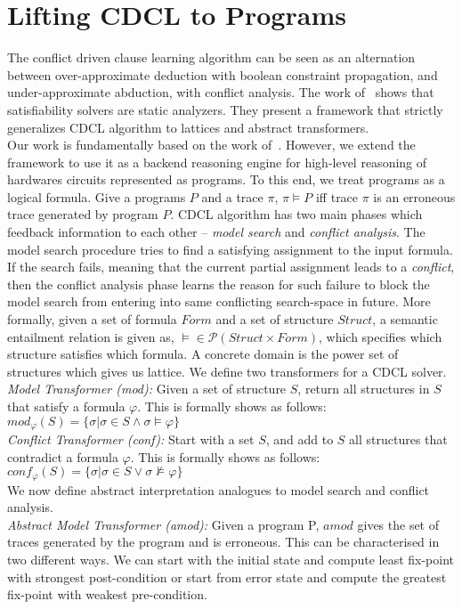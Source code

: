 \documentclass[a4paper,conference]{llncs}
\begin{document}
\section{Lifting CDCL to Programs}
The conflict driven clause learning algorithm can be seen as an 
alternation between over-approximate deduction with boolean 
constraint propagation, and under-approximate abduction, with 
conflict analysis. The work of~\cite{dhk2013-popl,sas12,tacas12} 
shows that satisfiability solvers are static analyzers. They present 
a framework that strictly generalizes CDCL algorithm to lattices and 
abstract transformers. \\
Our work is fundamentally based on the work of~\cite{dhk2013-popl}. 
However, we extend the framework to use it as a backend reasoning 
engine for high-level reasoning of hardwares circuits represented as programs.
To this end, we treat programs as a logical formula. Give a programs $P$ and a trace $\pi$,
$\pi \models P$ iff trace $\pi$ is an erroneous trace generated by program
$P$. CDCL algorithm has two main phases which feedback information to each other --
{\em model search} and {\em conflict analysis}. The model search procedure tries to find a 
satisfying assignment to the input formula. If the search fails, meaning that the current 
partial assignment leads to a {\em conflict}, then the conflict analysis phase learns the 
reason for such failure to block the model search from entering into same conflicting 
search-space in future. More formally, given a set of formula $Form$ and a set of 
structure $Struct$, a semantic entailment relation is given as, $\models \in \mathcal{P}(Struct
\times Form)$, which specifies which structure satisfies which formula. A 
concrete domain is the power set of structures which gives us lattice. 
We define two transformers for a CDCL solver. \\
\textit{Model Transformer (mod):} Given a set of structure $S$, return all structures 
in $S$ that satisfy a formula $\varphi$. This is formally shows as follows:
$mod_{\varphi}(S) = \{\sigma | \sigma \in S \wedge \sigma \models \varphi\}$ \\

\textit{Conflict Transformer (conf):} Start with a set $S$, and add to $S$ all structures 
that contradict a formula $\varphi$. This is formally shows as follows:
$conf_{\varphi}(S) = \{\sigma | \sigma \in S \vee \sigma \not\models \varphi\}$
\\
We now define abstract interpretation analogues to model search and conflict analysis.   \\
\textit{Abstract Model Transformer (amod):} Given a program P, $amod$ gives the 
set of traces generated by the program and is erroneous. This can be
characterised in two different ways. We can start with the initial state and
compute least fix-point with strongest post-condition or start from error state 
and compute the greatest fix-point with weakest pre-condition. \\
\end{document}
